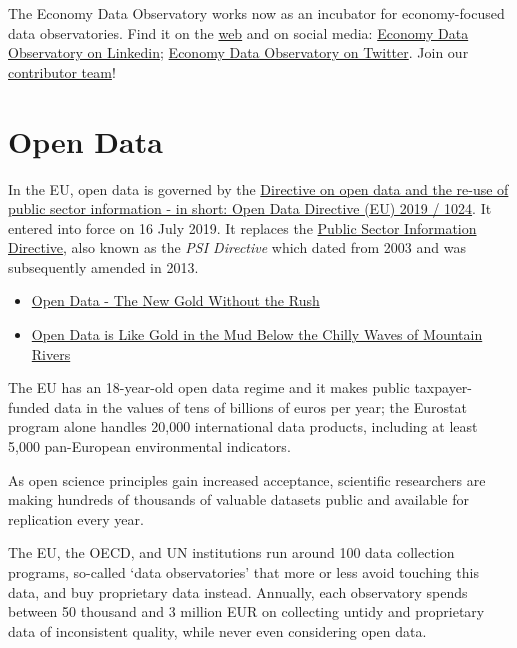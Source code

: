 \documentclass[
  a4paper,
  openany, a4paper, oneside]{book}
\providecommand{\tightlist}{%
  \setlength{\itemsep}{0pt}\setlength{\parskip}{0pt}}
\begin{document}
The Economy Data Observatory works now as an incubator for economy-focused data observatories. Find it on the \href{https://economy.dataobservatory.eu/}{web} and on social media: \href{https://www.linkedin.com/company/78562153/}{Economy Data Observatory on Linkedin}; \href{https://twitter.com/EconDataObs/}{Economy Data Observatory on Twitter}. Join our \href{https://economy.dataobservatory.eu/\#contributors}{contributor team}!

\hypertarget{open-data}{%
\chapter{Open Data}\label{open-data}}

In the EU, open data is governed by the \href{https://eur-lex.europa.eu/legal-content/EN/TXT/?qid=1561563110433\&uri=CELEX:32019L1024}{Directive on open data and the re-use of public sector information - in short: Open Data Directive (EU) 2019 / 1024}. It entered into force on 16 July 2019. It replaces the \href{https://eur-lex.europa.eu/legal-content/en/ALL/?uri=CELEX:32003L0098}{Public Sector Information Directive}, also known as the \emph{PSI Directive} which dated from 2003 and was subsequently amended in 2013.

\begin{itemize}
\tightlist
\item
  \href{https://dataandlyrics.com/post/2021-06-18-gold-without-rush/}{Open Data - The New Gold Without the Rush}
\item
  \href{https://greendeal.dataobservatory.eu/post/2021-06-10-founder-daniel-antal/}{Open Data is Like Gold in the Mud Below the Chilly Waves of Mountain Rivers}
\end{itemize}

The EU has an 18-year-old open data regime and it makes public taxpayer-funded data in the values of tens of billions of euros per year; the Eurostat program alone handles 20,000 international data products, including at least 5,000 pan-European environmental indicators.

As open science principles gain increased acceptance, scientific researchers are making hundreds of thousands of valuable datasets public and available for replication every year.

The EU, the OECD, and UN institutions run around 100 data collection programs, so-called `data observatories' that more or less avoid touching this data, and buy proprietary data instead. Annually, each observatory spends between 50 thousand and 3 million EUR on collecting untidy and proprietary data of inconsistent quality, while never even considering open data.
\end{document}

